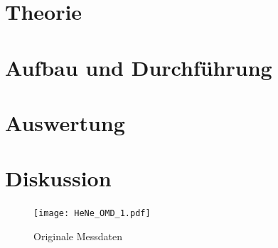 

\setlength{\parindent}{0em}



\tableofcontents
%

\newpage
%

\section{Theorie}



\section{Aufbau und Durchführung}

\newpage
\FloatBarrier

\section{Auswertung}

\newpage
\FloatBarrier

\section{Diskussion}



\nocite{*}
\printbibliography
\label{LastPage}

\begin{figure}
  \centering
  \texttt{[image: HeNe\_OMD\_1.pdf]}
  \caption{Originale Messdaten}
  \label{OMD}
\end{figure}

